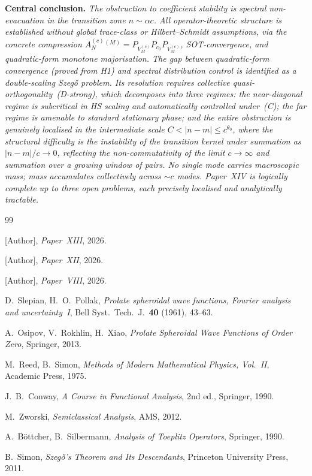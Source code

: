\documentclass[12pt,a4paper]{amsart}
\theoremstyle{definition}
\theoremstyle{remark}
\newcommand{\Ac}{A_N^{(c)}}
\begin{document}
\medskip\noindent
\textbf{Central conclusion.}
\emph{The obstruction to coefficient
stability is spectral non-evacuation
in the transition zone $n\sim\alpha c$.
All operator-theoretic structure is
established without global trace-class
or Hilbert--Schmidt assumptions,
via the concrete compression
$\Ac^{(M)}=P_{V_M^{(c)}}P_{c_0}
P_{V_M^{(c)}}$, SOT-convergence,
and quadratic-form monotone majorisation.
The gap between quadratic-form
convergence (proved from H1) and
spectral distribution control is
identified as a double-scaling
Szeg\H{o} problem.
Its resolution requires collective
quasi-orthogonality~(D-strong),
which decomposes into three regimes:
the near-diagonal regime is
subcritical in HS scaling and
automatically controlled under~(C);
the far regime is amenable to
standard stationary phase; and
the entire obstruction is genuinely
localised in the intermediate scale
$C<|n-m|\le c^{\theta_0}$, where the
structural difficulty is the
instability of the transition kernel
under summation as $|n-m|/c\to 0$,
reflecting the non-commutativity of
the limit $c\to\infty$ and summation
over a growing window of pairs.
No single mode carries macroscopic
mass; mass accumulates collectively
across $\sim c$ modes.
Paper~XIV is logically complete up
to three open problems, each
precisely localised and analytically
tractable.}

\begin{thebibliography}{99}

[Author], \textit{Paper~XIII}, 2026.

[Author], \textit{Paper~XII}, 2026.

[Author], \textit{Paper~VIII}, 2026.

D.~Slepian, H.~O.~Pollak,
\textit{Prolate spheroidal wave
functions, Fourier analysis and
uncertainty~I},
Bell Syst.\ Tech.\ J.\
\textbf{40} (1961), 43--63.

A.~Osipov, V.~Rokhlin, H.~Xiao,
\textit{Prolate Spheroidal Wave
Functions of Order Zero},
Springer, 2013.

M.~Reed, B.~Simon,
\textit{Methods of Modern Mathematical
Physics, Vol.~II},
Academic Press, 1975.

J.~B.~Conway,
\textit{A Course in Functional
Analysis}, 2nd ed., Springer, 1990.

M.~Zworski,
\textit{Semiclassical Analysis},
AMS, 2012.

A.~B\"ottcher, B.~Silbermann,
\textit{Analysis of Toeplitz
Operators}, Springer, 1990.

B.~Simon,
\textit{Szeg\H{o}'s Theorem and Its
Descendants},
Princeton University Press, 2011.

\end{thebibliography}
\end{document}
